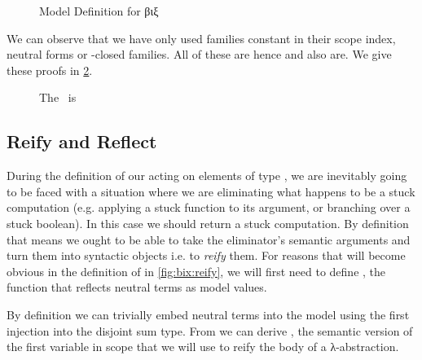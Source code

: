 
\begin{figure}[h]
\caption{Model Definition for βιξ\label{nbestuckmodel}}
\end{figure}

We can observe that we have only used families constant in their scope
index, neutral forms or -closed families. All of these are
 hence  and  also are. We give these
proofs in \cref{fig:thbixmodel}.

\begin{figure}[h]
\caption{The ~is }\label{fig:thbixmodel}
\end{figure}

\subsection{Reify and Reflect}

During the definition of our  acting on elements of
type , we are inevitably going to be faced with a situation
where we are eliminating what happens to be a stuck computation
(e.g. applying a stuck function to its argument, or branching over
a stuck boolean).
%
In this case we should return a stuck computation. By definition
that means we ought to be able to take the eliminator's semantic
arguments and turn them into syntactic objects i.e. to \emph{reify}
them. For reasons that will become obvious in the definition of
 in \cref{fig:bix:reify}, we will first need to
define , the function that reflects neutral terms as
model values.

By definition we can trivially embed neutral terms into the model
using the first injection into the disjoint sum type. From 
we can derive , the semantic version of the first variable
in scope that we will use to reify the body of a λ-abstraction.

